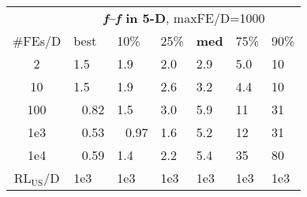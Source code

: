 \begin{tabular}{c|llllll}
 & \multicolumn{6}{|c}{\textbf{\textit{f}\raisebox{-0.35ex}{1}--\textit{f}\raisebox{-0.35ex}{24} in 5-D}, maxFE/D=1000}\\
\#FEs/D & best & 10\% & 25\% & \textbf{med} & 75\% & 90\%\\
2 & \hspace*{1ex}1.5 & \hspace*{1ex}1.9 & \hspace*{1ex}2.0 & \hspace*{1ex}2.9 & \hspace*{1ex}5.0 & 10\\
10 & \hspace*{1ex}1.5 & \hspace*{1ex}1.9 & \hspace*{1ex}2.6 & \hspace*{1ex}3.2 & \hspace*{1ex}4.4 & 10\\
100 & ~\,0.82 & \hspace*{1ex}1.5 & \hspace*{1ex}3.0 & \hspace*{1ex}5.9 & 11 & 31\\
1e3 & ~\,0.53 & ~\,0.97 & \hspace*{1ex}1.6 & \hspace*{1ex}5.2 & 12 & 31\\
1e4 & ~\,0.59 & \hspace*{1ex}1.4 & \hspace*{1ex}2.2 & \hspace*{1ex}5.4 & 35 & 80\\
$\text{RL}_{\text{US}}$/D & 1e3 & 1e3 & 1e3 & 1e3 & 1e3 & 1e3
\end{tabular}
